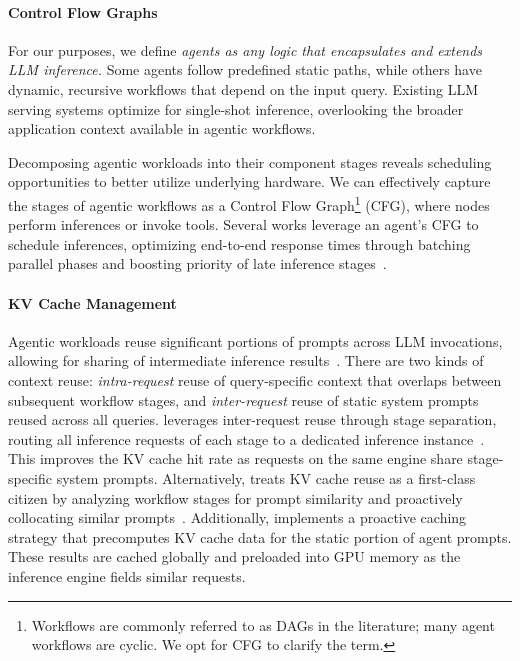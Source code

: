 \paragraph{Control Flow Graphs}
For our purposes, we define \emph{agents as any logic that encapsulates and extends LLM inference.}
Some agents follow predefined static paths, while others have dynamic, recursive workflows that depend on the input query.
Existing LLM serving systems optimize for single-shot inference, overlooking the broader application context available in agentic workflows.

Decomposing agentic workloads into their component stages reveals scheduling opportunities to better utilize underlying hardware.
We can effectively capture the stages of agentic workflows as a Control Flow Graph\footnote{Workflows are commonly referred to as DAGs in the literature; many agent workflows are cyclic. We opt for CFG to clarify the term.} (CFG), where nodes perform inferences or invoke tools.
Several works leverage an agent's CFG to schedule inferences, optimizing end-to-end response times through batching parallel phases and boosting priority of late inference stages~\cite{lin2024parrotefficientservingllmbased, luo2025autellixefficientservingengine, wadlom2026efficientllmservingagentic}.

\paragraph{KV Cache Management}
Agentic workloads reuse significant portions of prompts across LLM invocations, allowing for sharing of intermediate inference results~\cite{wadlom2026efficientllmservingagentic, pagonas2025cortexworkflowawareresourcepooling, lin2024parrotefficientservingllmbased, luo2025autellixefficientservingengine, peng2026hexgenflowoptimizingllminference}.
There are two kinds of context reuse: \emph{intra-request} reuse of query-specific context that overlaps between subsequent workflow stages, and \emph{inter-request} reuse of static system prompts reused across all queries.
\cortex{} leverages inter-request reuse through stage separation, routing all inference requests of each stage to a dedicated inference instance~\cite{pagonas2025cortexworkflowawareresourcepooling}.
This improves the KV cache hit rate as requests on the same engine share stage-specific system prompts.
Alternatively, \helium{} treats KV cache reuse as a first-class citizen by analyzing workflow stages for prompt similarity and proactively collocating similar prompts~\cite{wadlom2026efficientllmservingagentic}. Additionally, \helium{} implements a proactive caching strategy that precomputes KV cache data for the static portion of agent prompts. 
These results are cached globally and preloaded into GPU memory as the inference engine fields similar requests.

